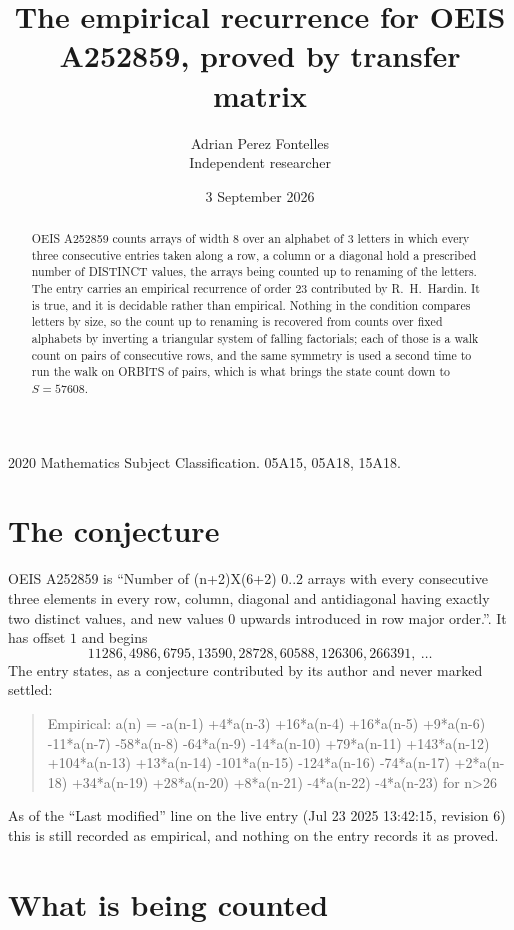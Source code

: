 \documentclass[11pt,a4paper]{article}
\title{The empirical recurrence for OEIS A252859, proved by transfer matrix}
\author{Adrian Perez Fontelles\\ \small Independent researcher}
\date{3 September 2026}
\theoremstyle{plain}
\theoremstyle{definition}
\begin{document}
\maketitle

\begin{abstract}
OEIS A252859 counts arrays of width $8$ over an alphabet of $3$ letters in which every three
consecutive entries taken along a row, a column or a diagonal hold a prescribed number of
DISTINCT values, the arrays being counted up to renaming of the letters. The entry carries an
empirical recurrence of order $23$ contributed by R.~H.~Hardin. It is true, and it is
decidable rather than empirical. Nothing in the condition compares letters by size, so the
count up to renaming is recovered from counts over fixed alphabets by inverting a triangular
system of falling factorials; each of those is a walk count on pairs of consecutive rows, and
the same symmetry is used a second time to run the walk on ORBITS of pairs, which is what
brings the state count down to $S=57608$.
\end{abstract}

\noindent\small 2020 Mathematics Subject Classification. 05A15, 05A18, 15A18.\normalsize

\section{The conjecture}

OEIS A252859 is ``Number of (n+2)X(6+2) 0..2 arrays with every consecutive three elements in every row, column, diagonal and antidiagonal having exactly two distinct values, and new values 0 upwards introduced in row major order.''. It has offset $1$ and begins
\[
11286, 4986, 6795, 13590, 28728, 60588, 126306, 266391,\ \dots
\]
The entry states, as a conjecture contributed by its author and never marked settled:
\begin{quote}
Empirical: a(n) = -a(n-1) +4*a(n-3) +16*a(n-4) +16*a(n-5) +9*a(n-6) -11*a(n-7) -58*a(n-8) -64*a(n-9) -14*a(n-10) +79*a(n-11) +143*a(n-12) +104*a(n-13) +13*a(n-14) -101*a(n-15) -124*a(n-16) -74*a(n-17) +2*a(n-18) +34*a(n-19) +28*a(n-20) +8*a(n-21) -4*a(n-22) -4*a(n-23) for n>26
\end{quote}
As of the ``Last modified'' line on the live entry (Jul 23 2025 13:42:15, revision 6) this is still
recorded as empirical, and nothing on the entry records it as proved.

\section{What is being counted}
\end{document}
